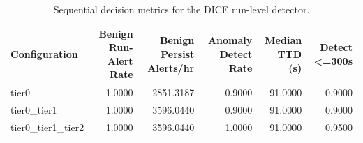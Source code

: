\begin{table}[t]
\centering
\caption{Sequential decision metrics for the DICE run-level detector.}
\label{tab:dice_sequential_metrics}
\footnotesize
\begin{tabular}{lrrrrr}
\toprule
Configuration & Benign Run-Alert Rate & Benign Persist Alerts/hr & Anomaly Detect Rate & Median TTD (s) & Detect <=300s \\
\midrule
tier0 & 1.0000 & 2851.3187 & 0.9000 & 91.0000 & 0.9000 \\
tier0_tier1 & 1.0000 & 3596.0440 & 0.9000 & 91.0000 & 0.9000 \\
tier0_tier1_tier2 & 1.0000 & 3596.0440 & 1.0000 & 91.0000 & 0.9500 \\
\bottomrule
\end{tabular}

\end{table}
